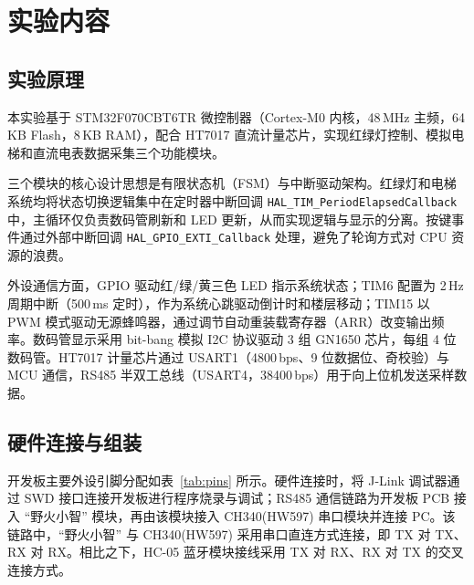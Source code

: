 \documentclass[a4paper,12pt,fontset=windows]{ctexart}
\begin{document}
\section{实验内容}

\subsection*{实验原理}

本实验基于 STM32F070CBT6TR 微控制器（Cortex-M0 内核，48\,MHz 主频，64\,KB Flash，8\,KB RAM），配合 HT7017 直流计量芯片，实现红绿灯控制、模拟电梯和直流电表数据采集三个功能模块。

\begin{sloppypar}
三个模块的核心设计思想是有限状态机（FSM）与中断驱动架构。红绿灯和电梯系统均将状态切换逻辑集中在定时器中断回调 \texttt{HAL\_TIM\_PeriodElapsedCallback} 中，主循环仅负责数码管刷新和 LED 更新，从而实现逻辑与显示的分离。按键事件通过外部中断回调 \texttt{HAL\_GPIO\_EXTI\_Callback} 处理，避免了轮询方式对 CPU 资源的浪费。
\end{sloppypar}

外设通信方面，GPIO 驱动红/绿/黄三色 LED 指示系统状态；TIM6 配置为 2\,Hz 周期中断（500\,ms 定时），作为系统心跳驱动倒计时和楼层移动；TIM15 以 PWM 模式驱动无源蜂鸣器，通过调节自动重装载寄存器（ARR）改变输出频率。数码管显示采用 bit-bang 模拟 I2C 协议驱动 3 组 GN1650 芯片，每组 4 位数码管。HT7017 计量芯片通过 USART1（4800\,bps、9 位数据位、奇校验）与 MCU 通信，RS485 半双工总线（USART4，38400\,bps）用于向上位机发送采样数据。

\subsection*{硬件连接与组装}

开发板主要外设引脚分配如表~\ref{tab:pins} 所示。硬件连接时，将 J-Link 调试器通过 SWD 接口连接开发板进行程序烧录与调试；RS485 通信链路为开发板 PCB 接入 ``野火小智'' 模块，再由该模块接入 CH340(HW597) 串口模块并连接 PC。该链路中，``野火小智'' 与 CH340(HW597) 采用串口直连方式连接，即 TX 对 TX、RX 对 RX。相比之下，HC-05 蓝牙模块接线采用 TX 对 RX、RX 对 TX 的交叉连接方式。
\end{document}
